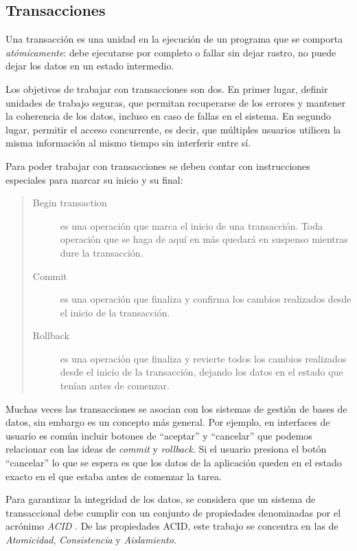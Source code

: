 \subsection{Transacciones}	

Una transacción es una unidad en la ejecución de un programa que se comporta 
\emph{atómicamente}: debe ejecutarse por completo o fallar sin dejar rastro, no
puede dejar los datos en un estado intermedio.

Los objetivos de trabajar con transacciones son dos.
En primer lugar, definir unidades de trabajo seguras, que permitan 
recuperarse de los errores y mantener la coherencia de los datos, incluso en caso de fallas en el sistema.
En segundo lugar, permitir el acceso concurrente, es decir, que múltiples
usuarios utilicen la misma información al mismo tiempo sin interferir entre sí.

\medskip
Para poder trabajar con transacciones se deben contar con instrucciones
especiales para marcar su inicio y su final:
\begin{quote}
	\label{ctxTransactional}
	\begin{description}
		\item[Begin transaction] es una operación que marca el inicio de una
		transacción. Toda operación que se haga de aquí en más quedará en suspenso
		mientras dure la transacción.
	
		\item[Commit] es una operación que finaliza y confirma los
		cambios realizados desde el inicio de la transacción. 
		
		\item[Rollback] es una operación que finaliza y revierte todos los cambios
		realizados desde el inicio de la transacción, 
		dejando los datos en el estado que tenían antes de comenzar.
	\end{description}
\end{quote}
   
\bigskip

Muchas veces las transacciones se asocian con los sistemas de gestión de bases
de datos, sin embargo es un concepto más general.
Por ejemplo, en interfaces de usuario es común incluir botones de
``aceptar'' y ``cancelar'' que podemos relacionar con las ideas de
\emph{commit} y \emph{rollback}. 
Si el usuario presiona el botón ``cancelar'' lo que se espera
es que los datos de la aplicación queden en el estado exacto en el que estaba
antes de comenzar la tarea.

\bigskip
\label{sec:ACID}
Para garantizar la integridad de los datos, se considera que un sistema de
transaccional debe cumplir con un conjunto de propiedades denominadas por el
acrónimo \emph{ACID} \cite{HaerderReuter83}.
De las propiedades ACID, este trabajo se concentra en las de \emph{Atomicidad},
\emph{Consistencia} y \emph{Aislamiento}. 

